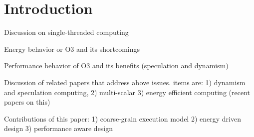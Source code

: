 \section{Introduction} 
\label{sec:intro}

Discussion on single-threaded computing

Energy behavior or O3 and its shortcomings

Performance behavior of O3 and its benefits (speculation and dynamism)

Discussion of related papers that address above issues. items are: 
1) dynamism and speculation computing,
2) multi-scalar
3) energy efficient computing (recent papers on this)

Contributions of this paper: 
1) coarse-grain execution model
2) energy driven design
3) performance aware design


% 
% 
% 
